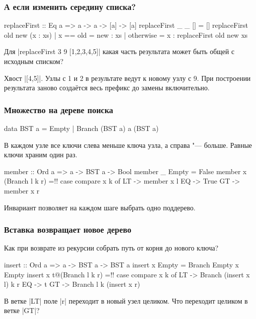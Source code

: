 \documentclass[11pt]{beamer}
\begin{document}
\begin{frame}[fragile]
  \frametitle{А если изменить середину списка?}
  \begin{haskell}
    replaceFirst :: Eq a => a -> a -> [a] -> [a]
    replaceFirst _ _ [] = []
    replaceFirst old new (x : xs)
      | x == old  = new : xs
      | otherwise = x : replaceFirst old new xs
  \end{haskell}
  Для \haskinline|replaceFirst 3 9 [1,2,3,4,5]| какая часть результата может быть общей с исходным списком? \pause

  Хвост \haskinline|[4,5]|. Узлы с 1 и 2 в результате ведут к новому узлу с 9. При построении результата заново создаётся весь префикс до замены включительно.
\end{frame}

\begin{frame}[fragile]
  \frametitle{Множество на дереве поиска}
  \begin{haskell}
    data BST a = Empty | Branch (BST a) a (BST a)
  \end{haskell}
  В каждом узле все ключи слева меньше ключа узла, а справа "--- больше. Равные ключи храним один раз.
  \begin{haskellsmall}
    member :: Ord a => a -> BST a -> Bool
    member _ Empty = False
    member x (Branch l k r) =!\pause! case compare x k of
      LT -> member x l
      EQ -> True
      GT -> member x r
  \end{haskellsmall}
  Инвариант позволяет на каждом шаге выбрать одно поддерево.
\end{frame}

\begin{frame}[fragile]
  \frametitle{Вставка возвращает новое дерево}
  Как при возврате из рекурсии собрать путь от корня до нового ключа?
  \begin{haskell}
    insert :: Ord a => a -> BST a -> BST a
    insert x Empty = Branch Empty x Empty
    insert x t@(Branch l k r) =!\pause! case compare x k of
      LT -> Branch (insert x l) k r
      EQ -> t
      GT -> Branch l k (insert x r)
  \end{haskell}
  В ветке \haskinline|LT| поле \haskinline|r| переходит в новый узел целиком. Что переходит целиком в ветке \haskinline|GT|?
\end{frame}
\end{document}
